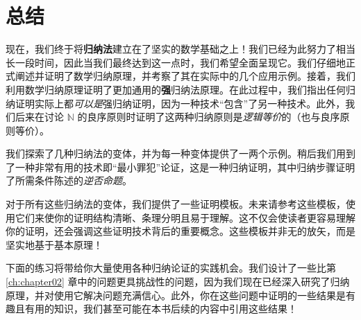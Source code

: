 \section{总结}

现在，我们终于将\textbf{归纳法}建立在了坚实的数学基础之上！我们已经为此努力了相当长一段时间，因此当我们最终达到这一点时，我们希望全面呈现它。我们仔细地正式阐述并证明了数学归纳原理，并考察了其在实际中的几个应用示例。接着，我们利用数学归纳原理证明了更加通用的\textbf{强}归纳法原理。在此过程中，我们指出任何归纳证明实际上都\emph{可以是}强归纳证明，因为一种技术``包含''了另一种技术。此外，我们后来在讨论 $\mathbb{N}$ 的良序原则时证明了这两种归纳原则是\emph{逻辑等价}的（也与良序原则等价）。

我们探索了几种归纳法的变体，并为每一种变体提供了一两个示例。稍后我们用到了一种非常有用的技术即``最小罪犯''论证，这是一种归纳证明，其中归纳步骤证明了所需条件陈述的\emph{逆否命题}。

对于所有这些归纳法的变体，我们提供了一些证明模板。未来请参考这些模板，使用它们来使你的证明结构清晰、条理分明且易于理解。这不仅会使读者更容易理解你的证明，还会强调这些证明技术背后的重要概念。这些模板并非无的放矢，而是坚实地基于基本原理！

下面的练习将带给你大量使用各种归纳论证的实践机会。我们设计了一些比第 \ref{ch:chapter02} 章中的问题更具挑战性的问题，因为我们现在已经深入研究了归纳原理，并对使用它解决问题充满信心。此外，你在这些问题中证明的一些结果是有趣且有用的知识，我们甚至可能在本书后续的内容中引用这些结果！
